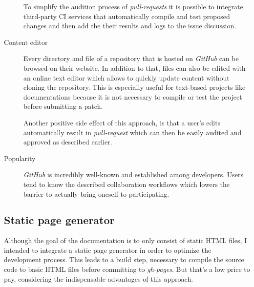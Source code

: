 \begin{description}
	To simplify the audition process of \textit{pull-requests} it is possible to integrate third-party \ac{CI} services that automatically compile and test proposed changes and then add the their results and logs to the issue discussion.

	\item[Content editor]\hfill

	Every directory and file of a repository that is hosted on \textit{GitHub} can be browsed on their website. In addition to that, files can also be edited with an online text editor which allows to quickly update content without cloning the repository. This is especially useful for text-based projects like documentations because it is not necessary to compile or test the project before submitting a patch.

	Another positive side effect of this approach, is that a user's edits automatically result in \textit{pull-request} which can then be easily audited and approved as described earlier.

	\item[Popularity]\hfill

	\textit{GitHub} is incredibly well-known and established among developers. Users tend to know the described collaboration workflows which lowers the barrier to actually bring oneself to participating.

\end{description}

\subsection{Static page generator}

Although the goal of the documentation is to only consist of static \ac{HTML} files, I intended to integrate a static page generator in order to optimize the development process. This leads to a build step, necessary to compile the source code to basic \ac{HTML} files before committing to \textit{gh-pages}. But that's a low price to pay, considering the indispensable advantages of this approach.

